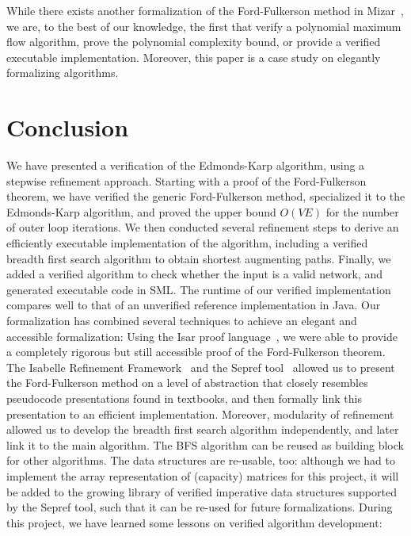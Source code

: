 \documentclass[11pt,a4paper]{article}
\begin{document}
While there exists another formalization of the Ford-Fulkerson method in
Mizar~\cite{Lee05}, we are, to the best of our knowledge, the first that verify a
polynomial maximum flow algorithm, prove the polynomial complexity bound, or
provide a verified executable implementation. Moreover, this paper is a case
study on elegantly formalizing algorithms.


\section{Conclusion}\label{sec:concl}
  We have presented a verification of the Edmonds-Karp algorithm, using a
  stepwise refinement approach. Starting with a proof of the Ford-Fulkerson
  theorem, we have verified the generic Ford-Fulkerson method, specialized it to
  the Edmonds-Karp algorithm, and proved the upper bound $O(VE)$ for the number
  of outer loop iterations. We then conducted several refinement steps to derive
  an efficiently executable implementation of the algorithm, including a
  verified breadth first search algorithm to obtain shortest augmenting paths.
  Finally, we added a verified algorithm to check whether the input is a valid
  network, and generated executable code in SML. The runtime of our verified
  implementation compares well to that of an unverified reference implementation
  in Java. Our formalization has combined several techniques to achieve an
  elegant and accessible formalization: Using the Isar proof
  language~\cite{Wenzel99}, we were able to provide a completely rigorous but
  still accessible proof of the Ford-Fulkerson theorem. The Isabelle Refinement
  Framework~\cite{LaTu12,La12} and the Sepref tool~\cite{La15,La16} allowed us
  to present the Ford-Fulkerson method on a level of abstraction that closely
  resembles pseudocode presentations found in textbooks, and then formally link
  this presentation to an efficient implementation. Moreover, modularity of
  refinement allowed us to develop the breadth first search algorithm
  independently, and later link it to the main algorithm. The BFS algorithm can
  be reused as building block for other algorithms. The data structures are
  re-usable, too: although we had to implement the array representation of
  (capacity) matrices for this project, it will be added to the growing library
  of verified imperative data structures supported by the Sepref tool, such that
  it can be re-used for future formalizations. During this project, we have
  learned some lessons on verified algorithm development: 
\end{document}
